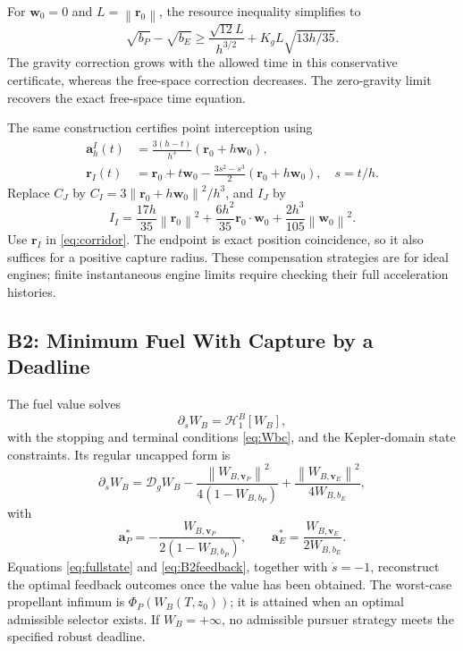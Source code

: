 \documentclass[journal,a4paper]{IEEEtran}
\newcommand{\D}{\mathcal D}
\newcommand{\HH}{\mathcal H}
\newcommand{\norm}[1]{\left\|#1\right\|}
\begin{document}
For $\mathbf w_0=0$ and $L=\norm{\mathbf r_0}$, the resource inequality simplifies to
\begin{equation}
 \sqrt{b_P}-\sqrt{b_E}
 \ge\frac{\sqrt{12}L}{h^{3/2}}
       +K_gL\sqrt{13h/35}.
 \label{eq:Jkeplerrestbound}
\end{equation}
The gravity correction grows with the allowed time in this conservative certificate, whereas the free-space correction decreases. The zero-gravity limit recovers the exact free-space time equation.

The same construction certifies point interception using
\begin{align}
 \mathbf a_h^I(t)&=\frac{3(h-t)}{h^3}(\mathbf r_0+h\mathbf w_0),\nonumber\\
 \mathbf r_I(t)&=\mathbf r_0+t\mathbf w_0
 -\frac{3s^2-s^3}{2}(\mathbf r_0+h\mathbf w_0),\quad s=t/h.
 \label{eq:Irelativepath}
\end{align}
Replace $C_J$ by $C_I=3\norm{\mathbf r_0+h\mathbf w_0}^2/h^3$, and $I_J$ by
\begin{equation}
 I_I=\frac{17h}{35}\norm{\mathbf r_0}^2
      +\frac{6h^2}{35}\mathbf r_0\cdot\mathbf w_0
      +\frac{2h^3}{105}\norm{\mathbf w_0}^2.
 \label{eq:Itidalquad}
\end{equation}
Use $\mathbf r_I$ in \eqref{eq:corridor}. The endpoint is exact position coincidence, so it also suffices for a positive capture radius. These compensation strategies are for ideal engines; finite instantaneous engine limits require checking their full acceleration histories.

\subsection{B2: Minimum Fuel With Capture by a Deadline}
The fuel value solves
\begin{equation}
 \boxed{\partial_s W_B=\HH^B_1[W_B],}
 \label{eq:B2}
\end{equation}
with the stopping and terminal conditions \eqref{eq:Wbc}, and the Kepler-domain state constraints. Its regular uncapped form is
\begin{equation}
 \partial_s W_B=\D_g W_B
 -\frac{\norm{W_{B,\mathbf v_P}}^2}{4(1-W_{B,b_P})}
 +\frac{\norm{W_{B,\mathbf v_E}}^2}{4W_{B,b_E}},
 \label{eq:B2expanded}
\end{equation}
with
\begin{equation}
 \boxed{\mathbf a_P^*=-\frac{W_{B,\mathbf v_P}}{2(1-W_{B,b_P})},\qquad
        \mathbf a_E^*= \frac{W_{B,\mathbf v_E}}{2W_{B,b_E}}.}
 \label{eq:B2feedback}
\end{equation}
Equations \eqref{eq:fullstate} and \eqref{eq:B2feedback}, together with $\dot s=-1$, reconstruct the optimal feedback outcomes once the value has been obtained. The worst-case propellant infimum is $\Phi_P(W_B(T,z_0))$; it is attained when an optimal admissible selector exists. If $W_B=+\infty$, no admissible pursuer strategy meets the specified robust deadline.
\end{document}
